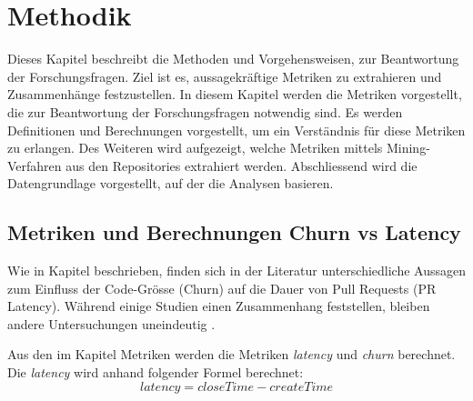 


\chapter{Methodik} %

\label{Chapter3} %

Dieses Kapitel beschreibt die Methoden und Vorgehensweisen, zur Beantwortung der Forschungsfragen. Ziel ist es, aussagekräftige Metriken zu extrahieren und Zusammenhänge festzustellen. 
In diesem Kapitel werden die Metriken vorgestellt, die zur Beantwortung der Forschungsfragen notwendig sind. Es werden Definitionen und Berechnungen vorgestellt, um ein Verständnis für diese Metriken zu erlangen. Des Weiteren wird aufgezeigt, welche Metriken mittels Mining-Verfahren aus den Repositories extrahiert werden. Abschliessend wird die Datengrundlage vorgestellt, auf der die Analysen basieren.

\section{Metriken und Berechnungen Churn vs Latency}
\label{sec:AnalyseChurnvsLatency}
Wie in Kapitel  beschrieben, finden sich in der Literatur unterschiedliche Aussagen zum Einfluss der Code-Grösse (Churn) auf die Dauer von Pull Requests (PR Latency). Während einige Studien einen Zusammenhang feststellen, bleiben andere Untersuchungen uneindeutig \parencite{hasan_understanding_2023}\parencite{kudrjavets_small_2022}.


Aus den im Kapitel  Metriken werden die Metriken \textit{latency} und \textit{churn} berechnet. Die \textit{latency} wird anhand folgender Formel berechnet:
\begin{equation}
latency = closeTime - createTime
\end{equation}

